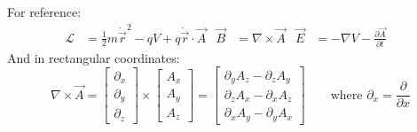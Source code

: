 \documentclass[12pt]{article}
\begin{document}
For reference:
\begin{align*}
    \mathcal{L} &= \tfrac{1}{2} m \dot{\vec{r}}^2 - qV + q \dot{\vec{r}} \cdot \vec{A} &
    \vec{B} &= \nabla \times \vec{A} &
    \vec{E} &= -\nabla V - \frac{\partial \vec{A}}{\partial t} &
\end{align*}
And in rectangular coordinates:
$$
\nabla \times \vec{A} = 
\left[
{\begin{array}{c}
    \partial_x \\
    \partial_y \\
    \partial_z
  \end{array} }
\right]
\times
\left[
{\begin{array}{c}
    A_x \\
    A_y \\
    A_z
  \end{array} }
\right]
=
\left[
{\begin{array}{c}
    \partial_y A_z - \partial_z A_y \\
    \partial_z A_x - \partial_x A_z \\
    \partial_x A_y - \partial_y A_x
\end{array} }
\right]
\quad\quad\text{where $\partial_x=\frac{\partial}{\partial x}$}
$$

\newpage 
\end{document}
